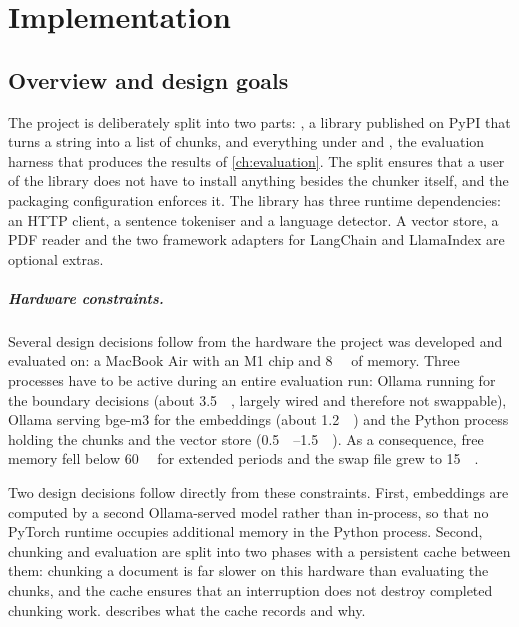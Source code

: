 \chapter{Implementation}
\label{ch:implementation}

\section{Overview and design goals}
\label{sec:impl-overview}

The project is deliberately split into two parts: \pkg{}, a library published on PyPI that
turns a string into a list of chunks, and everything under  and
, the evaluation harness that produces the results of
\cref{ch:evaluation}. The split ensures that a user of the library does not have to
install anything besides the chunker itself, and the packaging configuration enforces it.
The library has three runtime dependencies: an HTTP client, a sentence tokeniser and a
language detector. A vector store, a PDF reader and the two framework adapters for
LangChain and LlamaIndex are optional extras.

\paragraph{Hardware constraints.} Several design decisions follow from the hardware the
project was developed and evaluated on: a MacBook Air with an M1 chip and
\SI{8}{\giga\byte} of memory. Three processes have to be active during an entire
evaluation run: Ollama running  for the boundary decisions (about
\SI{3.5}{\giga\byte}, largely wired and therefore not swappable), Ollama serving bge-m3 for
the embeddings (about \SI{1.2}{\giga\byte}) and the Python process holding the chunks and
the vector store (\SIrange{0.5}{1.5}{\giga\byte}). As a consequence, free memory fell below
\SI{60}{\mega\byte} for extended periods and the swap file grew to \SI{15}{\giga\byte}.

Two design decisions follow directly from these constraints. First, embeddings are
computed by a second Ollama-served model rather than in-process, so that no PyTorch
runtime occupies additional memory in the Python process. Second, chunking and evaluation
are split into two phases with a persistent cache between them: chunking a document is
far slower on this hardware than evaluating the chunks, and the cache ensures that an
interruption does not destroy completed chunking work. 
describes what the cache records and why.

